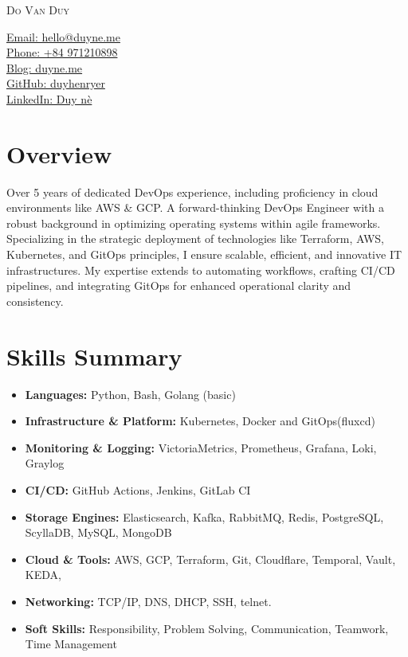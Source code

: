 \documentclass[11pt, a4paper]{article}
\begin{document}
\noindent
\begin{minipage}[t]{0.60\textwidth}
    \Huge\scshape Do Van Duy
\end{minipage}%
\begin{minipage}[t]{0.40\textwidth}
    \raggedleft
    \normalsize
    \href{mailto:hello@duyne.me}{Email: hello@duyne.me}\\
    \href{tel:+84971210898}{Phone: +84 971210898}\\
    \href{https://duyne.me}{Blog: duyne.me}\\
    \href{https://github.com/duyhenryerz}{GitHub: duyhenryer}\\
    \href{https://linkedin.com/in/duyne}{LinkedIn: Duy nè}
\end{minipage}
\vspace{0.75em}


\section{Overview}
\begingroup
{}
Over 5 years of dedicated DevOps experience, including proficiency in cloud environments like AWS \& GCP. A forward-thinking DevOps Engineer with a robust background in optimizing operating systems within agile frameworks. Specializing in the strategic deployment of technologies like Terraform, AWS, Kubernetes, and GitOps principles, I ensure scalable, efficient, and innovative IT infrastructures. My expertise extends to automating workflows, crafting CI/CD pipelines, and integrating GitOps for enhanced operational clarity and consistency.
\endgroup

\section{Skills Summary}
\begin{itemize}[leftmargin=*, label={}]
    \item \textbf{Languages:} Python, Bash, Golang (basic)
    \item \textbf{Infrastructure \& Platform:} Kubernetes, Docker and GitOps(fluxcd)
    \item \textbf{Monitoring \& Logging:} VictoriaMetrics, Prometheus, Grafana, Loki, Graylog
    \item \textbf{CI/CD:} GitHub Actions, Jenkins, GitLab CI
    \item \textbf{Storage Engines:} Elasticsearch, Kafka, RabbitMQ, Redis, PostgreSQL, ScyllaDB, MySQL, MongoDB
    \item \textbf{Cloud \& Tools:} AWS, GCP, Terraform, Git, Cloudflare, Temporal, Vault, KEDA,
    \item \textbf{Networking:} TCP/IP, DNS, DHCP, SSH, telnet.
    \item \textbf{Soft Skills:} Responsibility, Problem Solving, Communication, Teamwork, Time Management    
\end{itemize}
\end{document}
